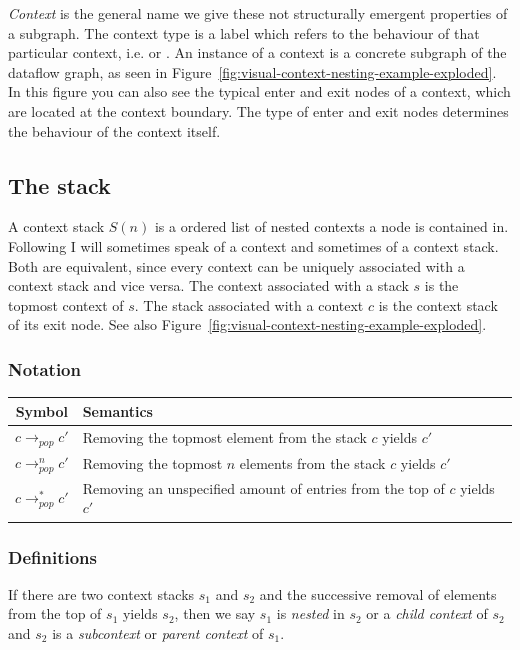 \emph{Context} is the general name we give these not structurally emergent properties of a subgraph.
The context type is a label which refers to the behaviour of that particular context, i.e. \ifop{} or \smap{}.
An instance of a context is a concrete subgraph of the dataflow graph, as seen in Figure~\ref{fig:visual-context-nesting-example-exploded}.
In this figure you can also see the typical enter and exit nodes of a context, which are located at the context boundary.
The type of enter and exit nodes determines the behaviour of the context itself.

\subsection{The stack}

A context stack $S(n)$ is a ordered list of nested contexts a node is contained in.
Following I will sometimes speak of a context and sometimes of a context stack.
Both are equivalent, since every context can be uniquely associated with a context stack and vice versa.
The context associated with a stack $s$ is the topmost context of $s$.
The stack associated with a context $c$ is the context stack of its exit node.
See also Figure~\ref{fig:visual-context-nesting-example-exploded}.

\subsubsection{Notation}

\begin{tabular}{c | l}
  Symbol & Semantics \\ \hline
  $c \rightarrow_{pop} c'$ & Removing the topmost element from the stack $c$ yields $c'$ \\
  $c \rightarrow_{pop}^n c'$ & Removing the topmost $n$ elements from the stack $c$ yields $c'$ \\
  $c \rightarrow_{pop}^* c'$ & Removing an unspecified amount of entries from the top of $c$ yields $c'$ \\
\end{tabular}

\subsubsection{Definitions}

If there are two context stacks $s_1$ and $s_2$ and the successive removal of elements from the top of $s_1$ yields $s_2$, then we say $s_1$ is \textit{nested} in $s_2$ or a \emph{child context} of $s_2$ and $s_2$ is a \textit{subcontext} or \emph{parent context} of $s_1$.

